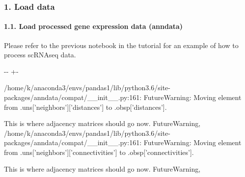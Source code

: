 \documentclass[letterpaper,10pt,english]{sphinxmanual}
\newlength\nbsphinxcodecellspacing
\begin{document}
\subsubsection{1. Load data}
\label{\detokenize{notebooks/04_Network_analysis/Network_analysis_with_Paul_etal_2015_data:1.-Load-data}}

\paragraph{1.1. Load processed gene expression data (anndata)}
\label{\detokenize{notebooks/04_Network_analysis/Network_analysis_with_Paul_etal_2015_data:1.1.-Load-processed-gene-expression-data-(anndata)}}
Please refer to the previous notebook in the tutorial for an example of how to process scRNA\sphinxhyphen{}seq data.

{
\begin{sphinxVerbatim}[commandchars=\\\{\}]
\llap{\color{nbsphinxin}[6]:\,\hspace{\fboxrule}\hspace{\fboxsep}}
  
\end{sphinxVerbatim}
}

{

\kern-\sphinxverbatimsmallskipamount\kern-\baselineskip
\kern+\FrameHeightAdjust\kern-\fboxrule
\vspace{\nbsphinxcodecellspacing}

\begin{sphinxVerbatim}[commandchars=\\\{\}]
/home/k/anaconda3/envs/pandas1/lib/python3.6/site-packages/anndata/compat/\_\_init\_\_.py:161: FutureWarning: Moving element from .uns['neighbors']['distances'] to .obsp['distances'].

This is where adjacency matrices should go now.
  FutureWarning,
/home/k/anaconda3/envs/pandas1/lib/python3.6/site-packages/anndata/compat/\_\_init\_\_.py:161: FutureWarning: Moving element from .uns['neighbors']['connectivities'] to .obsp['connectivities'].

This is where adjacency matrices should go now.
  FutureWarning,
\end{sphinxVerbatim}
}
\end{document}
